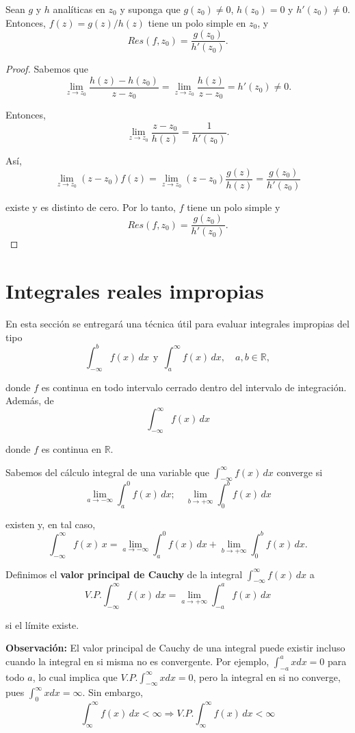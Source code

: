 \begin{propo}
Sean $g$ y $h$ analíticas en $z_0$ y suponga que $g(z_0) \neq 0$, $h(z_0) = 0$ y $h'(z_0) \neq 0$. Entonces, $f(z) = g(z)/h(z)$ tiene un polo simple en $z_0$, y
$$Res(f,z_0) = \frac{g(z_0)}{h'(z_0)}.$$
\end{propo}

\begin{proof}
Sabemos que
$$\lim_{z\to z_0} \frac{h(z) - h(z_0)}{z-z_0} = \lim_{z\to z_0} \frac{h(z)}{z-z_0} = h'(z_0) \neq 0.$$

Entonces,
$$\lim_{z\to z_0} \frac{z-z_0}{h(z)} = \frac{1}{h'(z_0)}.$$

Así,
$$\lim_{z\to z_0} (z-z_0) f(z) = \lim_{z\to z_0} (z-z_0) \frac{g(z)}{h(z)} = \frac{g(z_0)}{h'(z_0)}$$

existe y es distinto de cero. Por lo tanto, $f$ tiene un polo simple y 
$$Res(f,z_0) = \frac{g(z_0)}{h'(z_0)}.$$
\end{proof}

\section{Integrales reales impropias}

En esta sección se entregará una técnica útil para evaluar integrales impropias del tipo
$$\int_{-\infty}^b f(x) \,dx ~~\mbox{y}~~ \int_a^{\infty} f(x) \,dx, \quad a,b \in \mathbb{R},$$

donde $f$ es continua en todo intervalo cerrado dentro del intervalo de integración. Además, de
$$\int_{-\infty}^{\infty} f(x)\,dx$$

donde $f$ es continua en $\mathbb{R}$.

Sabemos del cálculo integral de una variable que $\int_{-\infty}^{\infty} f(x)\,dx$ converge si
$$\lim_{a \to - \infty} \int_{a}^{0}f(x) \,dx; \quad \lim_{b \to + \infty} \int_{0}^{b}f(x) \,dx$$

existen y, en tal caso,
$$\int_{-\infty}^{\infty} f(x) \,x = \lim_{a \to - \infty} \int_{a}^{0}f(x) \,dx +  \lim_{b \to + \infty} \int_{0}^{b}f(x) \,dx .$$

\begin{defi}
Definimos el \textbf{valor principal de Cauchy} de la integral $\int_{-\infty}^{\infty} f(x)\,dx$ a
$$V.P. \int_{- \infty}^{\infty} f(x) \,dx = \lim_{a\to + \infty} \int_{-a}^a f(x)\,dx$$

si el límite existe.
\end{defi}

\textbf{Observación:} El valor principal de Cauchy de una integral puede existir incluso cuando la integral en si misma no es convergente. Por ejemplo, $\int_{-a}^ax dx = 0$ para todo $a$, lo cual implica que $V.P. \int_{-\infty}^{\infty} xdx = 0$, pero la integral en si no converge, pues $\int_0^{\infty} xdx = \infty$. Sin embargo, 
$$\int_{\infty}^{\infty} f(x) \,dx < \infty \Rightarrow V.P. \int_{\infty}^{\infty} f(x) \,dx < \infty$$

